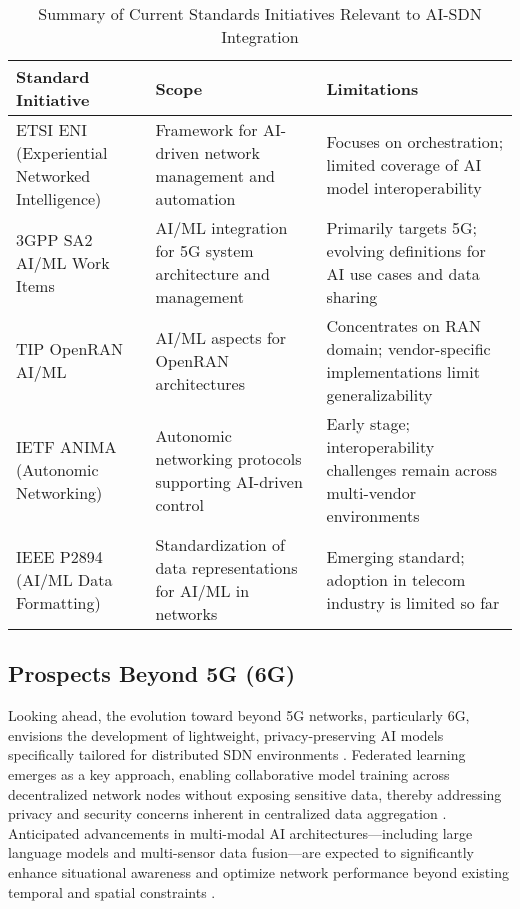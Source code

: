 \documentclass[sigconf]{acmart}
\begin{document}
\begin{table*}[htbp]
\centering
\caption{Summary of Current Standards Initiatives Relevant to AI-SDN Integration}
\label{tab:standards}
\begin{adjustbox}{max width=\textwidth}
\begin{tabular}{@{}lll@{}}
\toprule
\textbf{Standard Initiative} & \textbf{Scope} & \textbf{Limitations} \\ \midrule
ETSI ENI (Experiential Networked Intelligence) & Framework for AI-driven network management and automation & Focuses on orchestration; limited coverage of AI model interoperability \\ 
3GPP SA2 AI/ML Work Items & AI/ML integration for 5G system architecture and management & Primarily targets 5G; evolving definitions for AI use cases and data sharing \\
TIP OpenRAN AI/ML & AI/ML aspects for OpenRAN architectures & Concentrates on RAN domain; vendor-specific implementations limit generalizability \\
IETF ANIMA (Autonomic Networking) & Autonomic networking protocols supporting AI-driven control & Early stage; interoperability challenges remain across multi-vendor environments \\
IEEE P2894 (AI/ML Data Formatting) & Standardization of data representations for AI/ML in networks & Emerging standard; adoption in telecom industry is limited so far \\ \bottomrule
\end{tabular}
\end{adjustbox}
\end{table*}

\subsection{Prospects Beyond 5G (6G)}

Looking ahead, the evolution toward beyond 5G networks, particularly 6G, envisions the development of lightweight, privacy-preserving AI models specifically tailored for distributed SDN environments \cite{ref49,ref50}. Federated learning emerges as a key approach, enabling collaborative model training across decentralized network nodes without exposing sensitive data, thereby addressing privacy and security concerns inherent in centralized data aggregation \cite{ref52}. Anticipated advancements in multi-modal AI architectures—including large language models and multi-sensor data fusion—are expected to significantly enhance situational awareness and optimize network performance beyond existing temporal and spatial constraints \cite{ref52}.  
\end{document}
